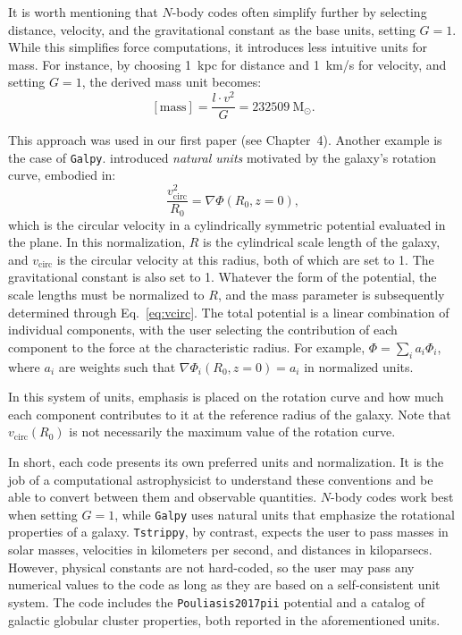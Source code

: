     It is worth mentioning that $N$-body codes often simplify further by selecting distance, velocity, and the gravitational constant as the base units, setting $G = 1$. While this simplifies force computations, it introduces less intuitive units for mass. For instance, by choosing 1~kpc for distance and 1~km/s for velocity, and setting $G = 1$, the derived mass unit becomes:
    \begin{equation}
        \left[\mathrm{mass}\right] = \frac{l \cdot v^2}{G} = 232509~\mathrm{M}_\odot.
    \end{equation}

    This approach was used in our first paper (see Chapter~4). Another example is the case of \texttt{Galpy}. \citet{2015ApJS..216...29B} introduced \textit{natural units} motivated by the galaxy's rotation curve, embodied in:
    \begin{equation}
        \frac{v_\mathrm{circ}^2}{R_0} = \nabla  \Phi \left(R_0, z=0\right),
        \label{eq:vcirc}
    \end{equation}
    which is the circular velocity in a cylindrically symmetric potential evaluated in the plane. In this normalization, $R$ is the cylindrical scale length of the galaxy, and $v_\mathrm{circ}$ is the circular velocity at this radius, both of which are set to 1. The gravitational constant is also set to 1. Whatever the form of the potential, the scale lengths must be normalized to $R$, and the mass parameter is subsequently determined through Eq.~\ref{eq:vcirc}. The total potential is a linear combination of individual components, with the user selecting the contribution of each component to the force at the characteristic radius. For example, $\Phi = \sum_i a_i\Phi_i$, where $a_i$ are weights such that $\nabla \Phi_i(R_0, z=0) = a_i$ in normalized units.

    In this system of units, emphasis is placed on the rotation curve and how much each component contributes to it at the reference radius of the galaxy. Note that $v_\mathrm{circ}(R_0)$ is not necessarily the maximum value of the rotation curve.

    In short, each code presents its own preferred units and normalization. It is the job of a computational astrophysicist to understand these conventions and be able to convert between them and observable quantities. $N$-body codes work best when setting $G = 1$, while \texttt{Galpy} uses natural units that emphasize the rotational properties of a galaxy. \texttt{Tstrippy}, by contrast, expects the user to pass masses in solar masses, velocities in kilometers per second, and distances in kiloparsecs.  However, physical constants are not hard-coded, so the user may pass any numerical values to the code as long as they are based on a self-consistent unit system. The code includes the \texttt{Pouliasis2017pii} potential and a catalog of galactic globular cluster properties, both reported in the aforementioned units.

